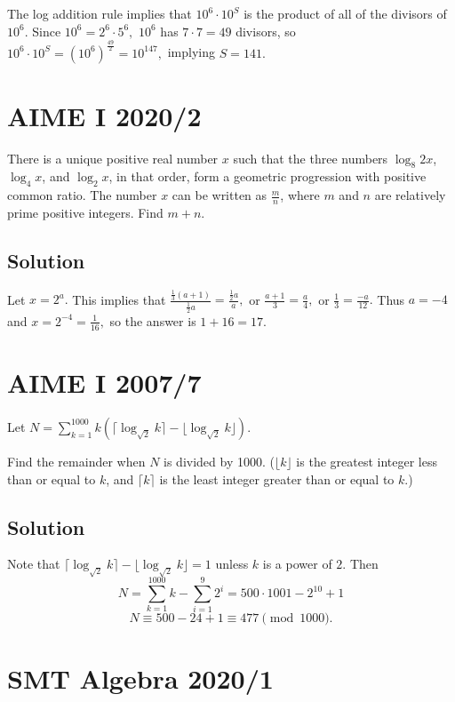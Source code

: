 \documentclass[blue,onecol]{shooting}
\begin{document}
The log addition rule implies that $10^6\cdot 10^S$ is the product of all of the divisors of $10^6.$ Since $10^6=2^6\cdot 5^6,$ $10^6$ has $7\cdot 7=49$ divisors, so $10^6\cdot 10^S=(10^6)^{\frac{49}{2}}=10^{147},$ implying $S=141.$

\section{AIME I 2020/2}

There is a unique positive real number $x$ such that the three numbers $\log_8{2x}$, $\log_4{x}$, and $\log_2{x}$, in that order, form a geometric progression with positive common ratio. The number $x$ can be written as $\frac{m}{n}$, where $m$ and $n$ are relatively prime positive integers. Find $m + n$.

\subsection{Solution}

Let $x=2^a.$ This implies that $\frac{\frac{1}{3}(a+1)}{\frac{1}{2}a}=\frac{\frac{1}{2}a}{a},$ or $\frac{a+1}{3}=\frac{a}{4},$ or $\frac{1}{3}=\frac{-a}{12}.$ Thus $a=-4$ and $x=2^{-4}=\frac{1}{16},$ so the answer is $1+16=17.$ 

\section{AIME I 2007/7}

Let $N = \sum\limits_{k = 1}^{1000} k ( \lceil \log_{\sqrt{2}} k \rceil  - \lfloor \log_{\sqrt{2}} k \rfloor ).$

Find the remainder when $N$ is divided by 1000. ($\lfloor{k}\rfloor$ is the greatest integer less than or equal to $k$, and $\lceil{k}\rceil$ is the least integer greater than or equal to $k$.)

\subsection{Solution}

Note that $\lceil\log_{\sqrt{2}}k\rceil-\lfloor\log_{\sqrt{2}}k\rfloor=1$ unless $k$ is a power of $2.$ Then
    \[N=\sum\limits_{k=1}^{1000}k-\sum\limits_{i=1}^{9}2^i=500\cdot 1001-2^{10}+1\]
    \[N\equiv 500-24+1\equiv 477\pmod{1000}.\]

\section{SMT Algebra 2020/1}
\end{document}
